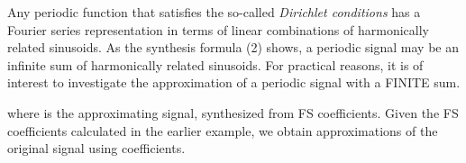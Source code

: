 \documentclass{article}
\begin{document}
\begin{CellGroup}
Any periodic function that satisfies the so-called {\itshape Dirichlet conditions} has a Fourier series representation in terms of linear combinations
of harmonically related sinusoids. As the synthesis formula (2) shows, a periodic signal may be an infinite sum of harmonically related sinusoids.
For practical reasons, it is of interest to investigate the approximation of a periodic signal with a FINITE sum.




where  is the approximating signal, synthesized from  FS coefficients. Given the FS coefficients calculated
in the earlier example, we obtain approximations of the original signal using  coefficients.



\begin{CellGroup}


\end{CellGroup}
\end{CellGroup}
\end{document}
